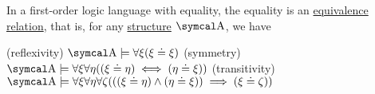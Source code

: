 \begin{proposition}\label{thm:first_order_equality_is_equivalence_relation}
  In a first-order logic language with equality, the equality is an \hyperref[def:equivalence_relation]{equivalence relation}, that is, for any \hyperref[def:first_order_structure]{structure} \( \CA \), we have
  \begin{PropEnum}
    (reflexivity) \( \CA \models \forall \xi (\xi \doteq \xi) \)
    (symmetry) \( \CA \models \forall \xi \forall \eta ((\xi \doteq \eta) \iff (\eta \doteq \xi)) \)
    (transitivity) \( \CA \models \forall \xi \forall \eta \forall \zeta (((\xi \doteq \eta) \wedge (\eta \doteq \xi)) \implies (\xi \doteq \zeta)) \)
  \end{PropEnum}
\end{proposition}
